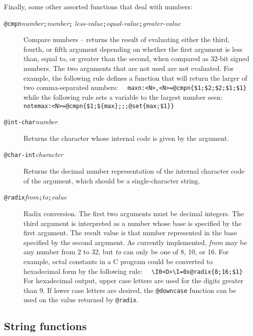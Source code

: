 Finally, some other assorted functions that deal with numbers:
\begin{description}
\item[{\tt @cmpn\ttlb}{\it number}{\tt ;}{\it number}{\tt ;}
{\it less-value}{\tt ;}{\it equal-value}{\tt ;}{\it greater-value}{\tt \ttrb}]
Compare numbers --
returns the result of evaluating either the third, fourth, or fifth
argument depending on whether the
first argument is less than, equal to, or greater than the second, when
compared as 32-bit signed numbers.
The two arguments that are not used are not evaluated.
For example, the following rule defines a function that will return the
larger of two comma-separated numbers:\newline
\verb'  maxn:<N>,<N>=@cmpn{$1;$2;$2;$1;$1}'\newline
while the following rule sets a variable to the largest number seen:\newline
\verb'  notemax:<N>=@cmpn{$1;${max};;;@set{max;$1}}'\newline
\item[{\tt @int-char\ttlb}{\it number}{\tt \ttrb}]
Returns the character whose internal code is given by the argument.
\item[{\tt @char-int\ttlb}{\it character}{\tt \ttrb}]
Returns the decimal number representation of the internal character code
of the argument, which should be a single-character string.
\item[{\tt @radix\ttlb}{\it from}{\tt ;}{\it to}{\tt ;}{\it value}{\tt \ttrb}]
Radix conversion.
The first two arguments must be decimal integers.  The third argument is
interpreted as a number whose base is specified by the first argument.
The result value is that number represented in the base specified by the
second argument.  As currently implemented, {\it from} may be any number
from 2 to 32, but {\it to} can only be one of 8, 10, or 16.
For example, octal constants in a C program could be
converted to hexadecimal form by the following rule:
\newline
\verb|  \I0<O>\I=0x@radix{8;16;$1}|
\newline
For hexadecimal output, upper case letters are used for the digits
greater than 9.  If lower case letters are desired, the \verb|@downcase|
function can be used on the value returned by \verb|@radix|.
\end{description}

\subsection{String functions}

